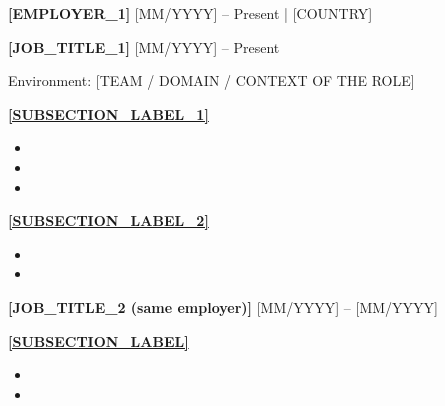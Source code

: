 \documentclass[11pt, a4paper]{\tpl/awesome-cv}
\begin{document}
\begin{cvparagraph}

\textbf{[EMPLOYER_1]} \hfill [MM/YYYY] -- Present | [COUNTRY]

\vspace{2mm}

{\large \textbf{[JOB_TITLE_1]}} \hfill [MM/YYYY] -- Present

\vspace{1mm}

Environment: [TEAM / DOMAIN / CONTEXT OF THE ROLE]

\textbf{\uline{[SUBSECTION_LABEL_1]}}
\begin{itemize}
\setlength{\itemsep}{0pt}
\setlength{\parskip}{0pt}
    \item [BULLET]
    \item [BULLET]
    \item [BULLET]
\end{itemize}

\textbf{\uline{[SUBSECTION_LABEL_2]}}
\begin{itemize}
\setlength{\itemsep}{0pt}
\setlength{\parskip}{0pt}
    \item [BULLET]
    \item [BULLET]
\end{itemize}

\vspace{1mm}

{\large \textbf{[JOB_TITLE_2 (same employer)]}} \hfill [MM/YYYY] -- [MM/YYYY]

\vspace{1mm}

\textbf{\uline{[SUBSECTION_LABEL]}}
\begin{itemize}
\setlength{\itemsep}{0pt}
\setlength{\parskip}{0pt}
    \item [BULLET]
    \item [BULLET]
\end{itemize}

\vspace{1mm}

\end{cvparagraph}

\newpage
\vspace*{5mm}
\end{document}
